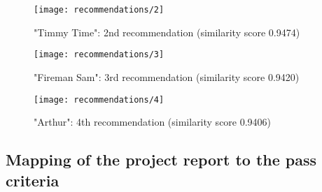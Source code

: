 \begin{figure}[h]
  \centering
  \texttt{[image: recommendations/2]}
  \caption{"Timmy Time": 2nd recommendation (similarity score 0.9474)}
  \label{fig:recommendations:1}
\end{figure}

\begin{figure}[h]
  \centering
  \texttt{[image: recommendations/3]}
  \caption{"Fireman Sam": 3rd recommendation (similarity score 0.9420)}
  \label{fig:recommendations:1}
\end{figure}

\begin{figure}[h]
  \centering
  \texttt{[image: recommendations/4]}
  \caption{"Arthur": 4th recommendation (similarity score 0.9406)}
  \label{fig:recommendations:1}
\end{figure}


\subsection{Mapping of the project report to the pass criteria}

